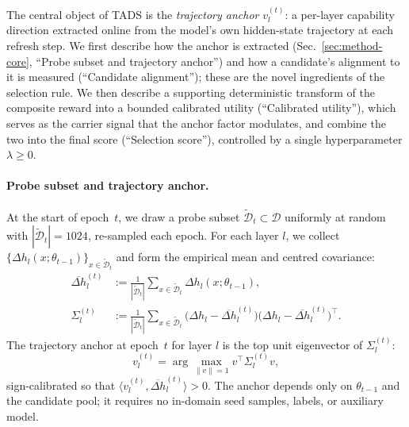 The central object of \textsc{TADS} is the \emph{trajectory anchor}
$v_l^{(t)}$: a per-layer capability direction extracted online
from the model's own hidden-state trajectory at each refresh step.
We first describe how the anchor is extracted
(Sec.~\ref{sec:method-core}, ``Probe subset and trajectory
anchor'') and how a candidate's alignment to it is measured
(``Candidate alignment''); these are the novel ingredients of the
selection rule. We then describe a supporting deterministic
transform of the composite reward into a bounded calibrated utility
(``Calibrated utility''), which serves as the carrier signal that
the anchor factor modulates, and combine the two into the final
score (``Selection score''), controlled by a single hyperparameter
$\lambda \ge 0$.

\paragraph{Probe subset and trajectory anchor.}
At the start of epoch~$t$, we draw a probe subset
$\widetilde{\mathcal{D}}_t \subset \mathcal{D}$ uniformly at random
with $|\widetilde{\mathcal{D}}_t| = 1024$, re-sampled each epoch.
For each layer $l$, we collect
$\{\Delta h_l(x;\theta_{t-1})\}_{x \in \widetilde{\mathcal{D}}_t}$
and form the empirical mean and centred covariance:
\begin{align}
  \overline{\Delta h}_l^{(t)}
   &:= \frac{1}{|\widetilde{\mathcal{D}}_t|}
        \sum_{x \in \widetilde{\mathcal{D}}_t}
        \Delta h_l(x;\theta_{t-1}),
   \label{eq:mu} \\[2pt]
  \Sigma_l^{(t)}
   &:= \frac{1}{|\widetilde{\mathcal{D}}_t|}
        \sum_{x \in \widetilde{\mathcal{D}}_t}
        \bigl(\Delta h_l - \overline{\Delta h}_l^{(t)}\bigr)
        \bigl(\Delta h_l - \overline{\Delta h}_l^{(t)}\bigr)^{\!\top}.
   \label{eq:sigma}
\end{align}
The trajectory anchor at epoch~$t$ for layer $l$ is the top unit
eigenvector of $\Sigma_l^{(t)}$:
\begin{equation}
  v_l^{(t)} = \arg\max_{\|v\| = 1} v^{\!\top}\Sigma_l^{(t)}v ,
  \label{eq:anchor-def}
\end{equation}
sign-calibrated so that
$\langle v_l^{(t)}, \overline{\Delta h}_l^{(t)} \rangle > 0$.
The anchor depends only on $\theta_{t-1}$ and the candidate pool;
it requires no in-domain seed samples, labels, or auxiliary model.

